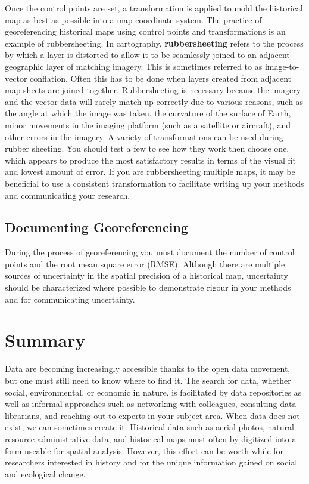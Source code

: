 \documentclass[
]{book}
\begin{document}
Once the control points are set, a transformation is applied to mold the historical map as best as possible into a map coordinate system. The practice of georeferencing historical maps using control points and transformations is an example of rubbersheeting. In cartography, \textbf{rubbersheeting} refers to the process by which a layer is distorted to allow it to be seamlessly joined to an adjacent geographic layer of matching imagery. This is sometimes referred to as image-to-vector conflation. Often this has to be done when layers created from adjacent map sheets are joined together. Rubbersheeting is necessary because the imagery and the vector data will rarely match up correctly due to various reasons, such as the angle at which the image was taken, the curvature of the surface of Earth, minor movements in the imaging platform (such as a satellite or aircraft), and other errors in the imagery. A variety of transformations can be used during rubber sheeting. You should test a few to see how they work then choose one, which appears to produce the most satisfactory results in terms of the visual fit and lowest amount of error. If you are rubbersheeting multiple maps, it may be beneficial to use a consistent transformation to facilitate writing up your methods and communicating your research.

\hypertarget{documenting-georeferencing}{%
\subsection{Documenting Georeferencing}\label{documenting-georeferencing}}

During the process of georeferencing you must document the number of control points and the root mean square error (RMSE). Although there are multiple sources of uncertainty in the spatial precision of a historical map, uncertainty should be characterized where possible to demonstrate rigour in your methods and for communicating uncertainty.

\hypertarget{summary-2}{%
\section{Summary}\label{summary-2}}

Data are becoming increasingly accessible thanks to the open data movement, but one must still need to know where to find it. The search for data, whether social, environmental, or economic in nature, is facilitated by data repositories as well as informal approaches such as networking with colleagues, consulting data librarians, and reaching out to experts in your subject area. When data does not exist, we can sometimes create it. Historical data such as aerial photos, natural resource administrative data, and historical maps must often by digitized into a form useable for spatial analysis. However, this effort can be worth while for researchers interested in history and for the unique information gained on social and ecological change.
\end{document}
